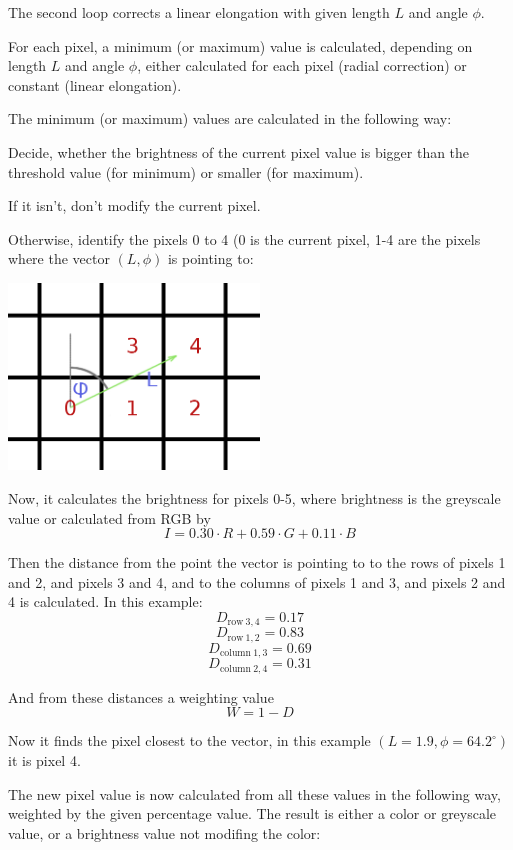 \documentclass[a4paper]{article}
\begin{document}
The second loop corrects a linear elongation with given length $L$ and angle $\phi$.

For each pixel, a minimum (or maximum) value is calculated, depending on length $L$ and angle $\phi$, either calculated for each pixel (radial correction) or constant (linear elongation).

The minimum (or maximum) values are calculated in the following way:

Decide, whether the brightness of the current pixel value is bigger than the threshold value (for minimum) or smaller (for maximum).

If it isn't, don't modify the current pixel.

Otherwise, identify the pixels 0 to 4 (0 is the current pixel, 1-4 are the pixels where the vector $(L,\phi)$ is pointing to:

\begin{center}\includegraphics[width=0.5\textwidth]{star_rounding_drawing.png}\end{center}

Now, it calculates the brightness for pixels 0-5, where brightness is the greyscale value or calculated from RGB by
$$I=0.30 \cdot R + 0.59 \cdot G + 0.11 \cdot B$$

Then the distance from the point the vector is pointing to to the rows of pixels 1 and 2, and pixels 3 and 4, and to the columns of pixels 1 and 3, and pixels 2 and 4 is calculated.
In this example:
$$D_{\mathrm{row\ 3, 4}} = 0.17$$
$$D_{\mathrm{row\ 1, 2}} = 0.83$$
$$D_{\mathrm{column\ 1, 3}} = 0.69$$
$$D_{\mathrm{column\ 2, 4}} = 0.31$$

And from these distances a weighting value
$$W = 1 - D$$

Now it finds the pixel closest to the vector, in this example $(L=1.9,\phi=64.2^\circ)$ it is pixel 4.

The new pixel value is now calculated from all these values in the following way, weighted by the given percentage value.
The result is either a color or greyscale value, or a brightness value not modifing the color:
\end{document}
